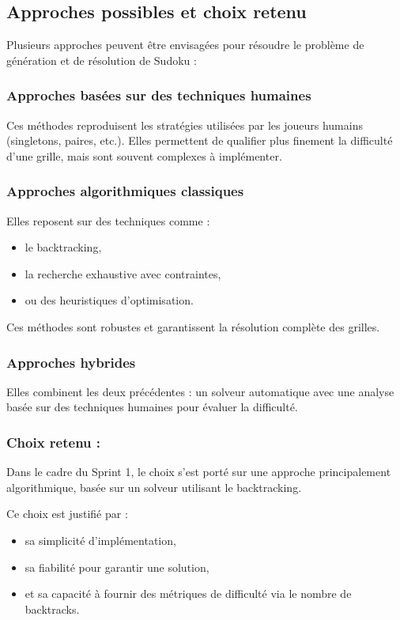 \documentclass[a4paper]{article}
\begin{document}
\subsection{Approches possibles et choix retenu}

Plusieurs approches peuvent être envisagées pour résoudre le problème de génération et de résolution de Sudoku :

\subsubsection{Approches basées sur des techniques humaines}

Ces méthodes reproduisent les stratégies utilisées par les joueurs humains (singletons, paires, etc.). Elles permettent de qualifier plus finement la difficulté d’une grille, mais sont souvent complexes à implémenter.

\subsubsection{Approches algorithmiques classiques}

Elles reposent sur des techniques comme :
\begin{itemize}
    \item le backtracking,
    \item la recherche exhaustive avec contraintes,
    \item ou des heuristiques d’optimisation.
\end{itemize}

Ces méthodes sont robustes et garantissent la résolution complète des grilles.

\subsubsection{Approches hybrides}

Elles combinent les deux précédentes : un solveur automatique avec une analyse basée sur des techniques humaines pour évaluer la difficulté.

\subsubsection*{Choix retenu :}

Dans le cadre du Sprint 1, le choix s’est porté sur une approche principalement algorithmique, basée sur un solveur utilisant le backtracking.

Ce choix est justifié par :
\begin{itemize}
    \item sa simplicité d’implémentation,
    \item sa fiabilité pour garantir une solution,
    \item et sa capacité à fournir des métriques de difficulté via le nombre de backtracks.
\end{itemize}
\end{document}
